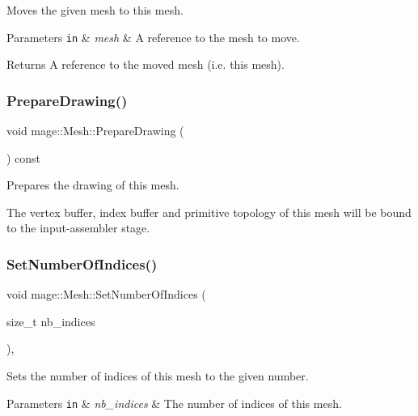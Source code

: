 Moves the given mesh to this mesh.


\begin{DoxyParams}[1]{Parameters}
\mbox{\tt in}  & {\em mesh} & A reference to the mesh to move. \\
\hline
\end{DoxyParams}
\begin{DoxyReturn}{Returns}
A reference to the moved mesh (i.\+e. this mesh). 
\end{DoxyReturn}
\hypertarget{classmage_1_1_mesh_a728979ae0be55283813eecf3e7c40e80}{}\label{classmage_1_1_mesh_a728979ae0be55283813eecf3e7c40e80} 
\subsubsection{\texorpdfstring{Prepare\+Drawing()}{PrepareDrawing()}}
{\footnotesize\ttfamily void mage\+::\+Mesh\+::\+Prepare\+Drawing (\begin{DoxyParamCaption}{ }\end{DoxyParamCaption}) const}

Prepares the drawing of this mesh.

The vertex buffer, index buffer and primitive topology of this mesh will be bound to the input-\/assembler stage. \hypertarget{classmage_1_1_mesh_a87ddba20dbdc57b168d38b02e7ccfdd0}{}\label{classmage_1_1_mesh_a87ddba20dbdc57b168d38b02e7ccfdd0} 
\subsubsection{\texorpdfstring{Set\+Number\+Of\+Indices()}{SetNumberOfIndices()}}
{\footnotesize\ttfamily void mage\+::\+Mesh\+::\+Set\+Number\+Of\+Indices (\begin{DoxyParamCaption}\item[{size\+\_\+t}]{nb\+\_\+indices }\end{DoxyParamCaption})\hspace{0.3cm}{\ttfamily [protected]}, {\ttfamily [noexcept]}}

Sets the number of indices of this mesh to the given number.


\begin{DoxyParams}[1]{Parameters}
\mbox{\tt in}  & {\em nb\+\_\+indices} & The number of indices of this mesh. \\
\hline
\end{DoxyParams}
\hypertarget{classmage_1_1_mesh_abdb9050ecea85108b1e890a68aa5b656}{}\label{classmage_1_1_mesh_abdb9050ecea85108b1e890a68aa5b656} 
